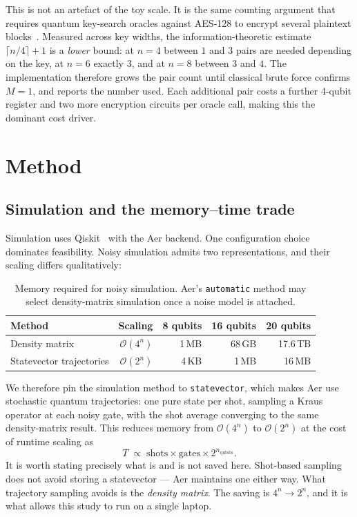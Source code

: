 \documentclass[11pt,a4paper]{article}
\newcommand{\bigO}[1]{\mathcal{O}\!\left(#1\right)}
\begin{document}
This is not an artefact of the toy scale. It is the same counting argument that
requires quantum key-search oracles against AES-128 to encrypt several
plaintext blocks~\citep{grassl2016,jaques2020}. Measured across key widths, the
information-theoretic estimate $\lceil n/4 \rceil + 1$ is a \emph{lower} bound:
at $n=4$ between $1$ and $3$ pairs are needed depending on the key, at $n=6$
exactly $3$, and at $n=8$ between $3$ and $4$. The implementation therefore
grows the pair count until classical brute force confirms $M = 1$, and reports
the number used. Each additional pair costs a further 4-qubit register and two
more encryption circuits per oracle call, making this the dominant cost driver.

\section{Method}

\subsection{Simulation and the memory--time trade}
\label{sec:memory}

Simulation uses Qiskit~\citep{qiskit2024} with the Aer backend. One
configuration choice dominates feasibility. Noisy simulation admits two
representations, and their scaling differs qualitatively:

\begin{table}[htbp]
  \centering
  \caption{Memory required for noisy simulation. Aer's \texttt{automatic} method
           may select density-matrix simulation once a noise model is attached.}
  \label{tab:memory}
  \begin{tabular}{lrrrr}
    \toprule
    Method & Scaling & 8 qubits & 16 qubits & 20 qubits \\
    \midrule
    Density matrix           & $\bigO{4^n}$ & 1\,MB & 68\,GB & 17.6\,TB \\
    Statevector trajectories & $\bigO{2^n}$ & 4\,KB & 1\,MB  & 16\,MB \\
    \bottomrule
  \end{tabular}
\end{table}

We therefore pin the simulation method to \texttt{statevector}, which makes Aer
use stochastic quantum trajectories: one pure state per shot, sampling a Kraus
operator at each noisy gate, with the shot average converging to the same
density-matrix result. This reduces memory from $\bigO{4^n}$ to $\bigO{2^n}$ at
the cost of runtime scaling as
\begin{equation}
  T \;\propto\; \text{shots} \times \text{gates} \times 2^{n_{\mathrm{qubits}}} .
  \label{eq:runtime}
\end{equation}
It is worth stating precisely what is and is not saved here. Shot-based sampling
does not avoid storing a statevector --- Aer maintains one either way. What
trajectory sampling avoids is the \emph{density matrix}. The saving is
$4^n \to 2^n$, and it is what allows this study to run on a single laptop.
\end{document}
